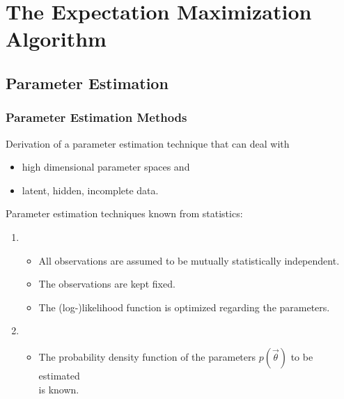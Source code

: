 \def\p{\vec{\theta}}
\def\hatp{\vec{\hat{\theta}}}
\def\BiasField{\vec{\beta}}

\section{The Expectation Maximization Algorithm}

\subsection{Parameter Estimation}

\begin{frame}
  \frametitle{Parameter Estimation Methods}

   Derivation of a parameter estimation technique that can deal with
  \begin{itemize}
    \item high dimensional parameter spaces and
    \item latent, hidden, incomplete data.
  \end{itemize}
  \pspread
  
  Parameter estimation techniques known from statistics: \\[0.25cm]
  
  \begin{enumerate}
    \item {}
      \begin{itemize}
        \item All observations are assumed to be mutually statistically independent. 
        \item The observations are kept fixed.
        \item The (log-)likelihood function is optimized regarding the parameters. \\[0.25cm] \pause
      \end{itemize}
    \item {}
      \begin{itemize}
        \item The probability density function of the parameters $p(\vec{\theta})$ to be estimated \\
          is known.
      \end{itemize}
  \end{enumerate}
\end{frame}


